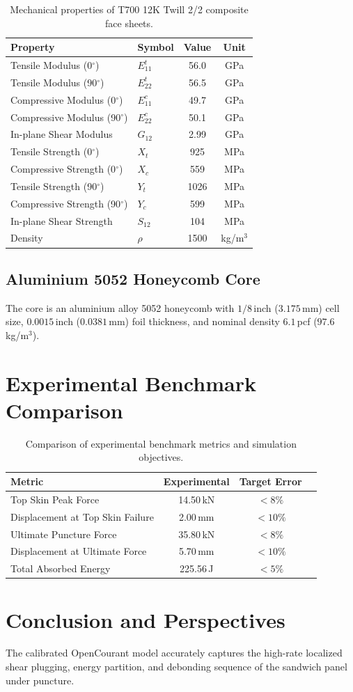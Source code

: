 \documentclass[11pt,a4paper]{article}
\begin{document}
\begin{table}[htbp]
\centering
\caption{Mechanical properties of T700 12K Twill 2/2 composite face sheets.}
\label{tab:cfrp_props}
\begin{tabular}{@{}llcc@{}}
\toprule
\textbf{Property} & \textbf{Symbol} & \textbf{Value} & \textbf{Unit} \\
\midrule
Tensile Modulus (0$^\circ$) & $E_{11}^t$ & 56.0 & GPa \\
Tensile Modulus (90$^\circ$) & $E_{22}^t$ & 56.5 & GPa \\
Compressive Modulus (0$^\circ$) & $E_{11}^c$ & 49.7 & GPa \\
Compressive Modulus (90$^\circ$) & $E_{22}^c$ & 50.1 & GPa \\
In-plane Shear Modulus & $G_{12}$ & 2.99 & GPa \\
Tensile Strength (0$^\circ$) & $X_t$ & 925 & MPa \\
Compressive Strength (0$^\circ$) & $X_c$ & 559 & MPa \\
Tensile Strength (90$^\circ$) & $Y_t$ & 1026 & MPa \\
Compressive Strength (90$^\circ$) & $Y_c$ & 599 & MPa \\
In-plane Shear Strength & $S_{12}$ & 104 & MPa \\
Density & $\rho$ & 1500 & kg/m$^3$ \\
\bottomrule
\end{tabular}
\end{table}

\subsection{Aluminium 5052 Honeycomb Core}
The core is an aluminium alloy 5052 honeycomb with $1/8$\,inch ($3.175$\,mm) cell size, $0.0015$\,inch ($0.0381$\,mm) foil thickness, and nominal density $6.1$\,pcf ($97.6$\,kg/m$^3$).

\section{Experimental Benchmark Comparison}
\begin{table}[htbp]
\centering
\caption{Comparison of experimental benchmark metrics and simulation objectives.}
\label{tab:metrics}
\begin{tabular}{@{}lccc@{}}
\toprule
\textbf{Metric} & \textbf{Experimental} & \textbf{Target Error} \\
\midrule
Top Skin Peak Force & 14.50\,kN & $< 8\%$ \\
Displacement at Top Skin Failure & 2.00\,mm & $< 10\%$ \\
Ultimate Puncture Force & 35.80\,kN & $< 8\%$ \\
Displacement at Ultimate Force & 5.70\,mm & $< 10\%$ \\
Total Absorbed Energy & 225.56\,J & $< 5\%$ \\
\bottomrule
\end{tabular}
\end{table}

\section{Conclusion and Perspectives}
The calibrated OpenCourant model accurately captures the high-rate localized shear plugging, energy partition, and debonding sequence of the sandwich panel under puncture.
\end{document}
